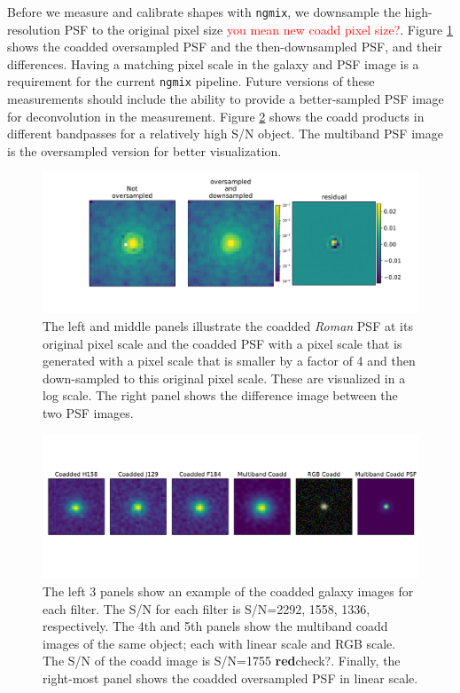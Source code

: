 \documentclass[fleqn,usenatbib]{mnras}
\begin{document}
Before we measure and calibrate shapes with \texttt{ngmix}, we downsample the high-resolution PSF to the original pixel size \textcolor{red}{you mean new coadd pixel size?}. Figure \ref{fig:coadd_oversample_res} shows the coadded oversampled PSF and the then-downsampled PSF, and their differences. Having a matching pixel scale in the galaxy and PSF image is a requirement for the current \texttt{ngmix} pipeline. Future versions of these measurements should include the ability to provide a better-sampled PSF image for deconvolution in the measurement. Figure \ref{fig:single_to_coadd_rgb} shows the coadd products in different bandpasses for a relatively high S/N object. The multiband PSF image is the oversampled version for better visualization. 


\begin{figure}
	\includegraphics[width=\columnwidth]{figure3.pdf}
    \vspace*{-5mm}
    \caption{The left and middle panels illustrate the coadded \emph{Roman} PSF at its original pixel scale and the coadded PSF with a pixel scale that is generated with a pixel scale that is smaller by a factor of 4 and then down-sampled to this original pixel scale. These are visualized in a log scale. The right panel shows the difference image between the two PSF images. }
    \label{fig:coadd_oversample_res}
\end{figure}


\begin{figure}
	\includegraphics[width=\textwidth]{figure4_og.pdf}
    \vspace*{-20mm}
    \caption{The left 3 panels show an example of the coadded galaxy images for each filter. The S/N for each filter is S/N=2292, 1558, 1336, respectively. The 4th and 5th panels show the multiband coadd images of the same object; each with linear scale and RGB scale. The S/N of the coadd image is S/N=1755 \textbf{red}{check?}. Finally, the right-most panel shows the coadded oversampled PSF in linear scale.}
    \label{fig:single_to_coadd_rgb}
\end{figure}
\end{document}
